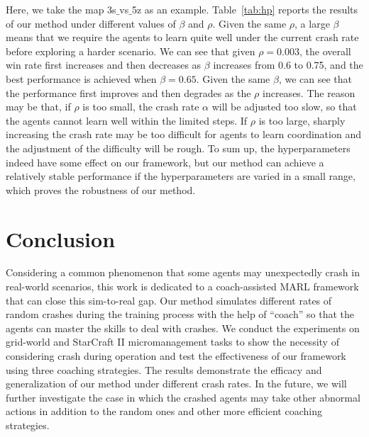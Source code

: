 \documentclass{article}
\begin{document}
Here, we take the map 3s$\_$vs$\_$5z as an example.
Table~\ref{tab:hp} reports the results of our method under different values of $\beta$ and $\rho$.
Given the same $\rho$, a large $\beta$ means that we require the agents to learn quite well under the current crash rate before exploring a harder scenario.
We can see that given $\rho=0.003$, the overall win rate first increases and then decreases as $\beta$ increases from 0.6 to 0.75, and the best performance is achieved when $\beta=0.65$.
Given the same $\beta$, we can see that the performance first improves and then degrades as the $\rho$ increases.
The reason may be that, if $\rho$ is too small, the crash rate $\alpha$ will be adjusted too slow, so that the agents cannot learn well within the limited steps.
If $\rho$ is too large, sharply increasing the crash rate may be too difficult for agents to learn coordination and the adjustment of the difficulty will be rough.
To sum up, the hyperparameters indeed have some effect on our framework, but our method can achieve a relatively stable performance if the hyperparameters are varied in a small range, which proves the robustness of our method.

\section{Conclusion}
\label{chap:conclusion}
Considering a common phenomenon that some agents may unexpectedly crash in real-world scenarios, this work is dedicated to a coach-assisted MARL framework that can close this sim-to-real gap.
Our method simulates different rates of random crashes during the training process with the help of ``coach'' so that the agents can master the skills to deal with crashes.
We conduct the experiments on grid-world and StarCraft II micromanagement tasks to show the necessity of considering crash during operation and test the effectiveness of our framework using three coaching strategies.
The results demonstrate the efficacy and generalization of our method under different crash rates.
In the future, we will further investigate the case in which the crashed agents may take other abnormal actions in addition to the random ones and other more efficient coaching strategies.



  
\end{document}
